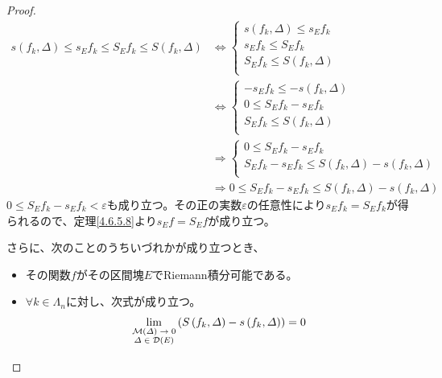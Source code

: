 \documentclass[dvipdfmx]{jsarticle}
\begin{document}
\begin{proof}
\begin{align*}
s\left( f_{k},\varDelta \right) \leq s_{E}f_{k} \leq S_{E}f_{k} \leq S\left( f_{k},\varDelta \right) &\Leftrightarrow \left\{ \begin{matrix}
s\left( f_{k},\varDelta \right) \leq s_{E}f_{k} \\
s_{E}f_{k} \leq S_{E}f_{k} \\
S_{E}f_{k} \leq S\left( f_{k},\varDelta \right) \\
\end{matrix} \right. \\
&\Leftrightarrow \left\{ \begin{matrix}
 - s_{E}f_{k} \leq - s\left( f_{k},\varDelta \right) \\
0 \leq S_{E}f_{k} - s_{E}f_{k} \\
S_{E}f_{k} \leq S\left( f_{k},\varDelta \right) \\
\end{matrix} \right. \\
&\Rightarrow \left\{ \begin{matrix}
0 \leq S_{E}f_{k} - s_{E}f_{k} \\
S_{E}f_{k} - s_{E}f_{k} \leq S\left( f_{k},\varDelta \right) - s\left( f_{k},\varDelta \right) \\
\end{matrix} \right. \\
&\Rightarrow 0 \leq S_{E}f_{k} - s_{E}f_{k} \leq S\left( f_{k},\varDelta \right) - s\left( f_{k},\varDelta \right)
\end{align*}
$0 \leq S_{E}f_{k} - s_{E}f_{k} < \varepsilon$も成り立つ。その正の実数$\varepsilon$の任意性により$s_{E}f_{k} = S_{E}f_{k}$が得られるので、定理\ref{4.6.5.8}より$s_{E}f = S_{E}f$が成り立つ。\par
さらに、次のことのうちいづれかが成り立つとき、
\begin{itemize}
\item
  その関数$f$がその区間塊$E$でRiemann積分可能である。
\item
  $\forall k \in \varLambda_{n}$に対し、次式が成り立つ。
\begin{align*}
\lim_{\scriptsize \begin{matrix}
\mathcal{M}(\varDelta) \rightarrow 0 \\
\varDelta \in \mathcal{D}(E) \\
\end{matrix}}\left( S\left( f_{k},\varDelta \right) - s\left( f_{k},\varDelta \right) \right) = 0
\end{align*}

\end{itemize}
\end{proof}
\end{document}
